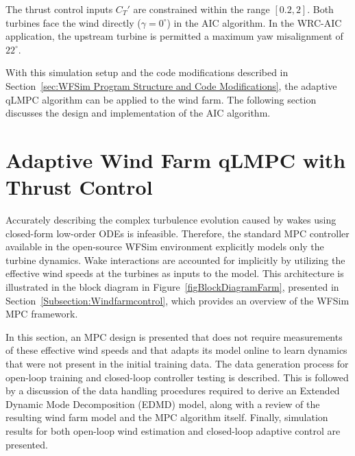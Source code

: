 The thrust control inputs $C_T'$ are constrained within the range $[0.2, 2]$.  Both turbines face the wind directly ($\gamma = 0^{\circ}$) in the AIC algorithm. In the WRC-AIC application, the upstream turbine is permitted a maximum yaw misalignment of $22^{\circ}$.

With this simulation setup and the code modifications described in Section~\ref{sec:WFSim Program Structure and Code Modifications}, the adaptive qLMPC algorithm can be applied to the wind farm. The following section discusses the design and implementation of the AIC algorithm.

\section{Adaptive Wind Farm qLMPC with Thrust Control} \label{sec:AdaptiveWindFarmqLMPCforAIC}
Accurately describing the complex turbulence evolution caused by wakes using closed-form low-order ODEs is infeasible. Therefore, the standard MPC controller available in the open-source WFSim environment explicitly models only the turbine dynamics. Wake interactions are accounted for implicitly by utilizing the effective wind speeds at the turbines as inputs to the model. This architecture is illustrated in the block diagram in Figure~\ref{figBlockDiagramFarm}, presented in Section~\ref{Subsection:Windfarmcontrol}, which provides an overview of the WFSim MPC framework.

In this section, an MPC design is presented that does not require measurements of these effective wind speeds and that adapts its model online to learn dynamics that were not present in the initial training data. The data generation process for open-loop training and closed-loop controller testing is described. This is followed by a discussion of the data handling procedures required to derive an Extended Dynamic Mode Decomposition (EDMD) model, along with a review of the resulting wind farm model and the MPC algorithm itself. Finally, simulation results for both open-loop wind estimation and closed-loop adaptive control are presented. 

